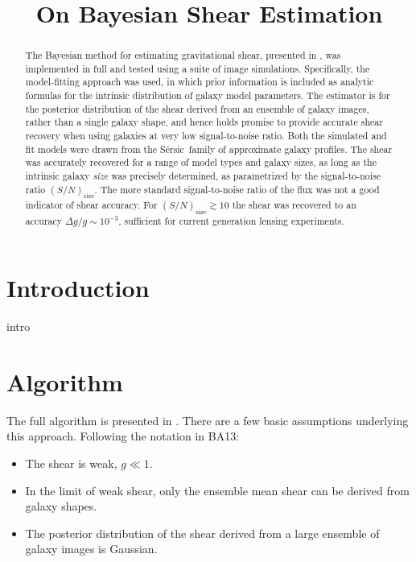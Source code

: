 \documentclass[12pt,preprint]{aastex}
\newcommand{\Tsn}{$(S/N)_{\textrm{size}}$}
\newcommand{\sersic}{S\'{e}rsic}
\begin{document}
\title{On Bayesian Shear Estimation}



\begin{abstract}

The Bayesian method for estimating gravitational shear, presented in
\cite{ba13}, was implemented in full and tested using a suite of image
simulations.  Specifically, the model-fitting approach was used, in which prior
information is included as analytic formulas for the intrinsic distribution of
galaxy model parameters. The estimator is for the posterior distribution of the
shear derived from an ensemble of galaxy images, rather than a single galaxy
shape, and hence holds promise to provide accurate shear recovery when using
galaxies at very low signal-to-noise ratio.  Both the simulated and fit models
were drawn from the \sersic\ family of approximate galaxy profiles.  The shear
was accurately recovered for a range of model types and galaxy sizes, as long
as the intrinsic galaxy {\it size} was precisely determined, as parametrized by
the signal-to-noise ratio \Tsn.   The more standard signal-to-noise ratio of
the flux was not a good indicator of shear accuracy.  For \Tsn$\gtrsim 10$ the
shear was recovered to an accuracy $\Delta g/g \sim 10^{-3}$, sufficient for
current generation lensing experiments.  \end{abstract}

\section{Introduction} \label{sec:intro}

intro

\section{Algorithm} \label{sec:algo}

The full algorithm is presented in \citet[][BA13]{ba13}.  There are a few basic
assumptions underlying this approach.  Following the notation in BA13:

\begin{itemize}

    \item The shear is weak, $g \ll 1$.

    \item In the limit of weak shear, only the ensemble mean shear can be
        derived from galaxy shapes.

    \item The posterior distribution of the shear derived from a large ensemble
        of galaxy images is Gaussian.


\end{itemize}
\end{document}
